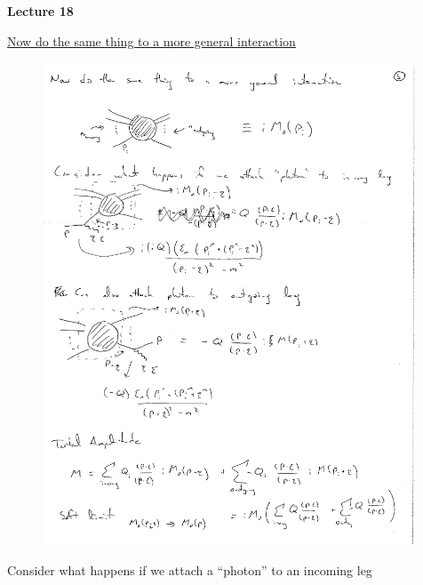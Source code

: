 



\thispagestyle{fancy}

\begin{center}
{\huge \textbf{Lecture 18}}
\end{center}

{\fontsize{14}{16}\selectfont

\underline{Now do the same thing to a more general interaction}


\begin{figure}[h]
\includegraphics[width=0.99\textwidth]{./generalScattering.pdf}
\end{figure}

Consider what happens if we attach a ``photon'' to an incoming leg

}
